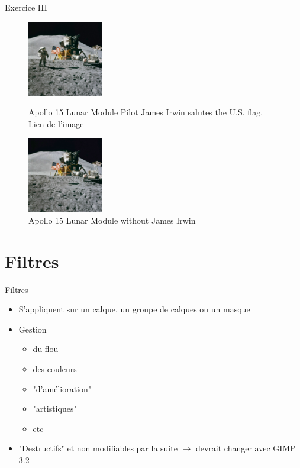 \documentclass[10pt,svgnames,usenames,table]{beamer}
\begin{document}
	\begin{frame}{Exercice III}
	
		\begin{figure}[H]
			\centering
			\begin{minipage}{.5\textwidth}
				\centering
				\includegraphics[height=125px]{Images/purge/Apollo_15_flag,_rover,_LM,_Irwin}
				\caption{\tiny{Apollo 15 Lunar Module Pilot James Irwin salutes the U.S. flag.\\\href{http://louvainlinux.github.io/atelier-gimp/src/Images/purge/Apollo_15_flag,_rover,_LM,_Irwin.jpg}{Lien de l'image}}}
			\end{minipage}%
			\begin{minipage}{.5\textwidth}
				\centering
				\includegraphics[height=125px]{Images/purge/Apollo_15_flag,_rover,_LM}
				\caption{\tiny{Apollo 15 Lunar Module without James Irwin}}
			\end{minipage}
		\end{figure}	
	\end{frame}



\section{Filtres}
	\begin{frame}{Filtres}
		\begin{itemize}
			\item S'appliquent sur un calque, un groupe de calques ou un masque
			\item Gestion 
				\begin{itemize}
				\item du flou
				\item des couleurs
				\item "d'amélioration"
				\item "artistiques"
				\item etc
				\end{itemize}
			\item "Destructifs" et non modifiables par la suite $\rightarrow$ devrait changer avec GIMP 3.2
		\end{itemize}
	\end{frame}
\end{document}
